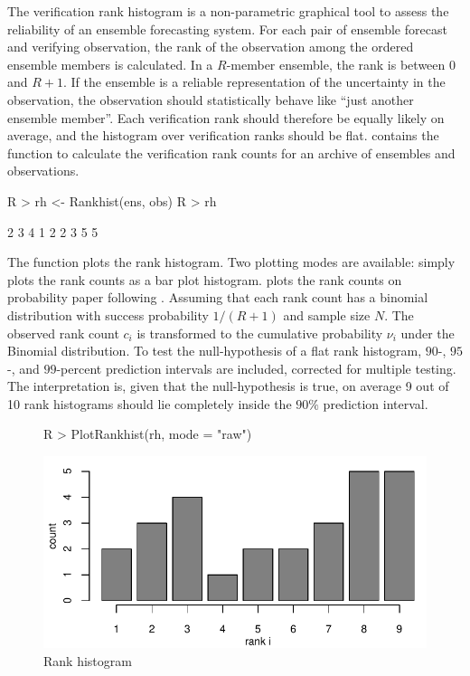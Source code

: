 \documentclass[article]{jss}
\begin{document}
The verification rank histogram \citep{hamill2001interpretation} is a non-parametric graphical tool to assess the reliability of an ensemble forecasting system.
For each pair of ensemble forecast and verifying observation, the rank of the observation among the ordered ensemble members is calculated.
In a $R$-member ensemble, the rank is between $0$ and $R+1$.
If the ensemble is a reliable representation of the uncertainty in the observation, the observation should statistically behave like ``just another ensemble member''. 
Each verification rank should therefore be equally likely on average, and the histogram over verification ranks should be flat. 
 contains the function  to calculate the verification rank counts for an archive of ensembles and observations.
%
\begin{Schunk}
\begin{Sinput}
R > rh <- Rankhist(ens, obs)
R > rh
\end{Sinput}
\begin{Soutput}
[1] 2 3 4 1 2 2 3 5 5
\end{Soutput}
\end{Schunk}
%


The function  plots the rank histogram.
Two plotting modes are available:
 simply plots the rank counts as a bar plot histogram.
 plots the rank counts on probability paper following \citet{broecker2008reliability}. 
Assuming that each rank count has a binomial distribution with success probability $1/(R+1)$ and sample size $N$.
The observed rank count $c_i$ is transformed to the cumulative probability $\nu_i$ under the Binomial distribution.
To test the null-hypothesis of a flat rank histogram, $90$-, $95$-, and $99$-percent prediction intervals are included, corrected for multiple testing.
The interpretation is, given that the null-hypothesis is true, on average 9 out of 10 rank histograms should lie completely inside the $90\%$ prediction interval.



\begin{figure}
\begin{center}
%
\begin{Schunk}
\begin{Sinput}
R > PlotRankhist(rh, mode = "raw")
\end{Sinput}
\end{Schunk}
\includegraphics{fig-rank-hist}
%
\end{center}
\caption{Rank histogram}
\label{fig:rank-hist}
\end{figure}
\end{document}
